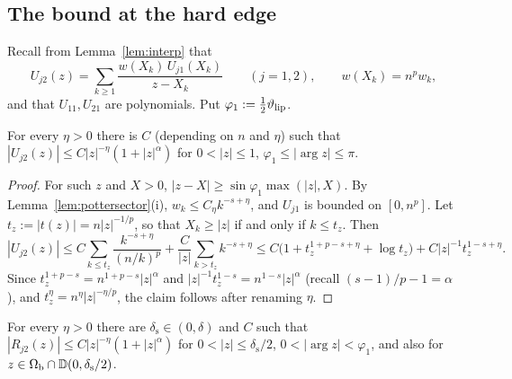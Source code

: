 \subsection{The bound at the hard edge}\label{sec:apriori-bound}

Recall from Lemma~\ref{lem:interp} that
\begin{equation}\label{eq:U-sum}
  U_{j2}(z)=\sum_{k\ge1}\frac{w(X_k)\,U_{j1}(X_k)}{z-X_k}\qquad(j=1,2),\qquad w(X_k)=n^pw_k,
\end{equation}
and that $U_{11},U_{21}$ are polynomials. Put $\varphi_1:=\frac12\vartheta_{\mathrm{lip}}$.

\begin{lemma}\label{lem:sumbound}
For every $\eta>0$ there is $C$ (depending on $n$ and $\eta$) such that $|U_{j2}(z)|\le C|z|^{-\eta}(1+|z|^{\alpha})$ for
$0<|z|\le1$, $\varphi_1\le|\arg z|\le\pi$.
\end{lemma}

\begin{proof}
For such $z$ and $X>0$, $|z-X|\ge\sin\varphi_1\max(|z|,X)$. By Lemma~\ref{lem:pottersector}(i),
$w_k\le C_\eta k^{-s+\eta}$, and $U_{j1}$ is bounded on $[0,n^p]$. Let $t_z:=|t(z)|=n|z|^{-1/p}$, so that $X_k\ge|z|$ if and only if
$k\le t_z$. Then
\[
  |U_{j2}(z)|\le C\sum_{k\le t_z}\frac{k^{-s+\eta}}{(n/k)^p}+\frac C{|z|}\sum_{k>t_z}k^{-s+\eta}
  \le C\bigl(1+t_z^{1+p-s+\eta}+\log t_z\bigr)+C|z|^{-1}t_z^{1-s+\eta}.
\]
Since $t_z^{1+p-s}=n^{1+p-s}|z|^{\alpha}$ and $|z|^{-1}t_z^{1-s}=n^{1-s}|z|^{\alpha}$ (recall $(s-1)/p-1=\alpha$), and
$t_z^\eta=n^\eta|z|^{-\eta/p}$, the claim follows after renaming $\eta$.
\end{proof}

\begin{lemma}\label{lem:lenssector}
For every $\eta>0$ there are $\delta_{\mathrm s}\in(0,\delta)$ and $C$ such that $|R_{j2}(z)|\le C|z|^{-\eta}(1+|z|^\alpha)$ for
$0<|z|\le\delta_{\mathrm s}/2$, $0<|\arg z|<\varphi_1$, and also for $z\in\Omega_{\mathrm{b}}\cap \mathbb D(0,\delta_{\mathrm s}/2)$.
\end{lemma}

